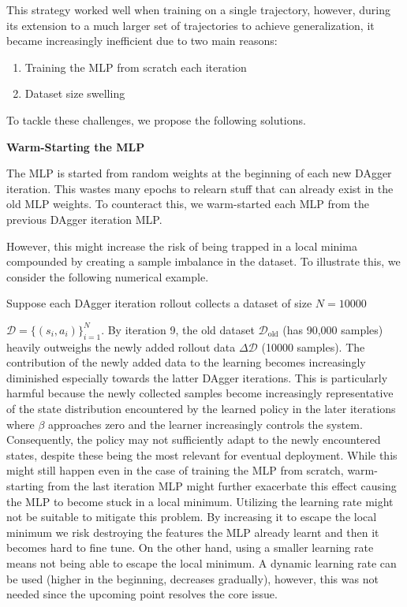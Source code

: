 This strategy worked well when training on a single trajectory, however,
during its extension to a much larger set of trajectories to achieve
generalization, it became increasingly inefficient due to two main
reasons:

\begin{enumerate}
  \item Training the MLP from scratch each iteration
  \item Dataset size swelling
\end{enumerate}

To tackle these challenges, we propose the following solutions.

\noindent\textbf{Warm-Starting the MLP}

The MLP is started from random weights at the beginning of each new
DAgger iteration. This wastes many epochs to relearn stuff that can
already exist in the old MLP weights. To counteract this, we
warm-started each MLP from the previous DAgger iteration MLP.

However, this might increase the risk of being trapped in a local minima
compounded by creating a sample imbalance in the dataset. To illustrate
this, we consider the following numerical example.

Suppose each DAgger iteration rollout collects a dataset of size $N =
10000$

$\mathcal{D} = \{(s_i, a_i)\}_{i=1}^N$. By iteration 9, the old dataset
$\mathcal{D}_{\text{old}}$ (has 90,000 samples) heavily outweighs the
newly added rollout data $\Delta \mathcal{D}$ (10000 samples). The
contribution of the newly added data to the learning becomes
increasingly diminished especially towards the latter DAgger iterations.
This is particularly harmful because the newly collected samples become
increasingly representative of the state distribution encountered by the
learned policy in the later iterations where $\beta$ approaches zero and
the learner increasingly controls the system. Consequently, the policy
may not sufficiently adapt to the newly encountered states, despite
these being the most relevant for eventual deployment. While this might
still happen even in the case of training the MLP from scratch,
warm-starting from the last iteration MLP might further exacerbate this
effect causing the MLP to become stuck in a local minimum. Utilizing the
learning rate might not be suitable to mitigate this problem. By
increasing it to escape the local minimum we risk destroying the
features the MLP already learnt and then it becomes hard to fine tune.
On the other hand, using a smaller learning rate means not being able to
escape the local minimum. A dynamic learning rate can be used (higher in
the beginning, decreases gradually), however, this was not needed since
the upcoming point resolves the core issue.

